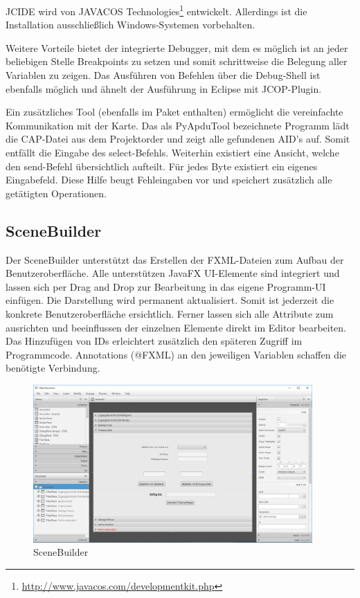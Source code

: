 \documentclass[	a4paper,
			11pt,
			oneside,
			parskip]{scrartcl}
\begin{document}
JCIDE wird von JAVACOS Technologies\footnote{\url{http://www.javacos.com/developmentkit.php}} entwickelt. Allerdings ist die Installation ausschließlich Windows-Systemen vorbehalten. \medskip

Weitere Vorteile bietet der integrierte Debugger, mit dem es möglich ist an jeder beliebigen Stelle Breakpoints zu setzen und somit schrittweise die Belegung aller Variablen zu zeigen.
Das Ausführen von Befehlen über die Debug-Shell ist ebenfalls möglich und ähnelt der Ausführung in Eclipse mit JCOP-Plugin. \medskip

Ein zusätzliches Tool (ebenfalls im Paket enthalten) ermöglicht die vereinfachte Kommunikation mit der Karte. Das als \glqq PyApduTool\grqq\/ bezeichnete Programm lädt die CAP-Datei aus dem Projektorder und zeigt alle gefundenen AID's auf. Somit entfällt die Eingabe des select-Befehls. Weiterhin existiert eine Ansicht, welche den send-Befehl übersichtlich aufteilt. Für jedes Byte existiert ein eigenes Eingabefeld. Diese Hilfe beugt Fehleingaben vor und speichert zusätzlich alle getätigten Operationen.

\subsection{SceneBuilder}

Der SceneBuilder unterstützt das Erstellen der FXML-Dateien zum Aufbau der Benutzeroberfläche. Alle unterstützen JavaFX UI-Elemente sind integriert und lassen sich per \glqq Drag and Drop\grqq\/ zur Bearbeitung in das eigene Programm-UI einfügen. Die Darstellung wird permanent aktualisiert. Somit ist jederzeit die konkrete Benutzeroberfläche ersichtlich. Ferner lassen sich alle Attribute zum ausrichten und beeinflussen der einzelnen Elemente direkt im Editor bearbeiten. Das Hinzufügen von IDs erleichtert zusätzlich den späteren Zugriff im Programmcode. Annotations (@FXML) an den jeweiligen Variablen schaffen die benötigte Verbindung.

\begin{figure}[!htb]
	\centering
  	\includegraphics[width=0.95\textwidth]{img/scenebuilder}
	\caption{SceneBuilder}
	\label{scene}
\end{figure}
\end{document}
